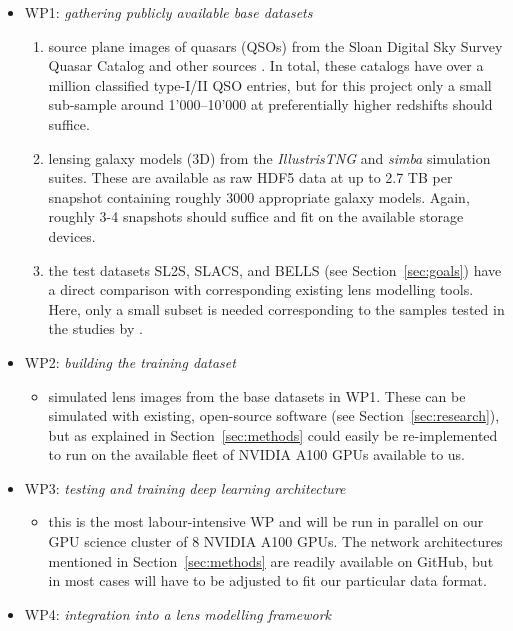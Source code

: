 \documentclass[a4paper,10pt]{article}
\begin{document}
\begin{itemize}[leftmargin=*]
\item WP1: \emph{gathering publicly available base datasets}
\begin{enumerate}[leftmargin=*]
\item source plane images of quasars (QSOs) from the Sloan Digital Sky
Survey Quasar Catalog \citep{Schneider10,Paris18} and other
sources \citep{Flesch21}. In total, these catalogs have over a
million classified type-I/II QSO entries, but for this project
only a small sub-sample around 1'000--10'000 at preferentially
higher redshifts should suffice.
\item lensing galaxy models (3D) from the \emph{IllustrisTNG}
\citep{Nelson18} and \emph{simba} \citep{Dave19} simulation
suites.  These are available as raw HDF5 data at up to 2.7 TB per
snapshot containing roughly 3000 appropriate galaxy models. Again,
roughly 3-4 snapshots should suffice and fit on the available
storage devices.
\item the test datasets SL2S, SLACS, and BELLS (see
Section~\ref{sec:goals}) have a direct comparison with
corresponding existing lens modelling tools. Here, only a small
subset is needed corresponding to the samples tested in the
studies by \cite{Adam22,Denzel21,Morningstar19,Hezaveh17}.
\end{enumerate}
\item WP2: \emph{building the training dataset}
\begin{itemize}[leftmargin=*]
\item simulated lens images from the base datasets in WP1. These can be
simulated with existing, open-source software (see
Section~\ref{sec:research}), but as explained in
Section~\ref{sec:methods} could easily be re-implemented
to run on the available fleet of NVIDIA A100 GPUs available to us.
\end{itemize}
\item WP3: \emph{testing and training deep learning architecture}
\begin{itemize}[leftmargin=*]
\item this is the most labour-intensive WP and will be run in parallel
on our GPU science cluster of 8 NVIDIA A100 GPUs. The network
architectures mentioned in Section~\ref{sec:methods} are
readily available on GitHub, but in most cases will have to be
adjusted to fit our particular data format.
\end{itemize}
\item WP4: \emph{integration into a lens modelling framework}

\end{itemize}
\end{document}
